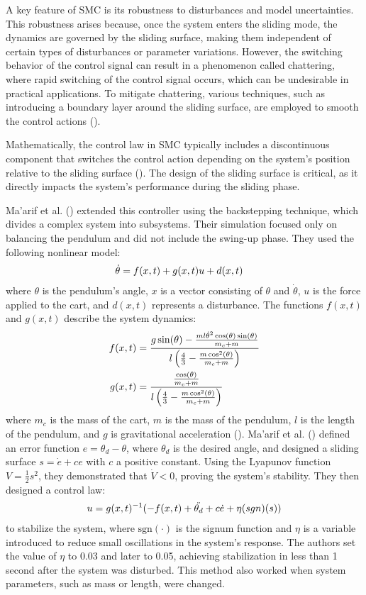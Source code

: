 A key feature of SMC is its robustness to disturbances and model uncertainties. This robustness arises because, once the system enters the sliding mode, the dynamics are governed by the sliding surface, making them independent of certain types of disturbances or parameter variations. However, the switching behavior of the control signal can result in a phenomenon called chattering, where rapid switching of the control signal occurs, which can be undesirable in practical applications. To mitigate chattering, various techniques, such as introducing a boundary layer around the sliding surface, are employed to smooth the control actions (\cite{chalanga_output_2019}).

Mathematically, the control law in SMC typically includes a discontinuous component that switches the control action depending on the system's position relative to the sliding surface (\cite{mahmoud_optimizing_2021}). The design of the sliding surface is critical, as it directly impacts the system's performance during the sliding phase.

Ma'arif et al. (\citeyear{maarif_backstepping_2022}) extended this controller using the backstepping technique, which divides a complex system into subsystems. Their simulation focused only on balancing the pendulum and did not include the swing-up phase. They used the following nonlinear model:
\begin{align}
    \dot{\theta} &= f(x,t) + g(x,t)u + d(x,t) \notag
\end{align}
where $\theta$ is the pendulum's angle, $x$ is a vector consisting of $\theta$ and $\dot{\theta}$, $u$ is the force applied to the cart, and $d(x,t)$ represents a disturbance. The functions $f(x,t)$ and $g(x,t)$ describe the system dynamics:
\begin{align}
    f(x,t) &= \frac{g\sin(\theta) - \frac{ml\dot{\theta}^2\cos(\theta)\sin(\theta)}{m_c+m}}{l\left(\frac{4}{3}-\frac{m\cos^2(\theta)}{m_c+m}\right)} \notag \\
    g(x,t) &= \frac{\frac{\cos(\theta)}{m_c+m}}{l\left(\frac{4}{3}-\frac{m\cos^2(\theta)}{m_c+m}\right)} \notag
\end{align}
where $m_c$ is the mass of the cart, $m$ is the mass of the pendulum, $l$ is the length of the pendulum, and $g$ is gravitational acceleration (\cite{valluru_stabilization_2017}). Ma'arif et al. (\citeyear{maarif_backstepping_2022}) defined an error function $e = \theta_d - \theta$, where $\theta_d$ is the desired angle, and designed a sliding surface $s = \dot{e} + c e$ with $c$ a positive constant. Using the Lyapunov function $V=\frac{1}{2}s^2$, they demonstrated that $\dot{V}<0$, proving the system's stability. They then designed a control law:
\begin{align}
    u = g(x,t)^{-1}(-f(x,t) +\ddot{\theta_d} + c\dot{e} + \eta\text(sgn)(s)) \notag
\end{align}
to stabilize the system, where $\text{sgn}(\cdot)$ is the signum function and $\eta$ is a variable introduced to reduce small oscillations in the system's response. The authors set the value of $\eta$ to 0.03 and later to 0.05, achieving stabilization in less than 1 second after the system was disturbed. This method also worked when system parameters, such as mass or length, were changed.
